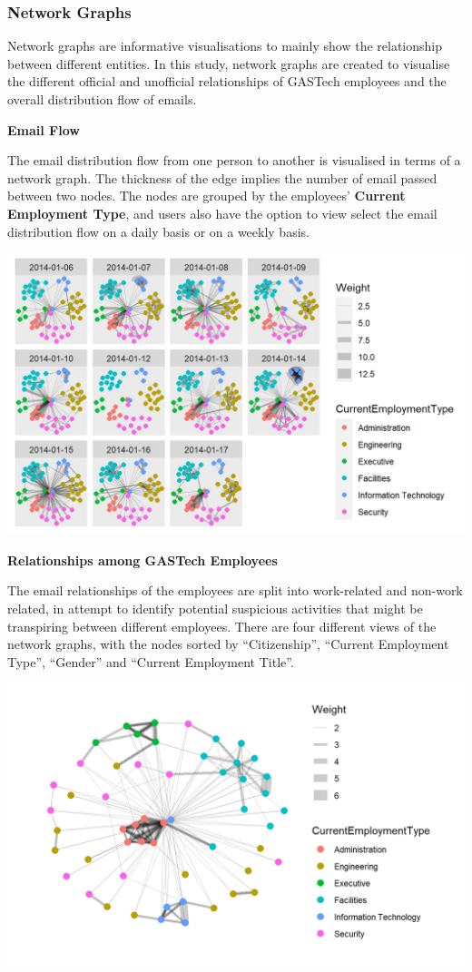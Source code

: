 \documentclass{acm_proc_article-sp}
\begin{document}
\hypertarget{network-graphs-1}{%
\subsubsection{Network Graphs}\label{network-graphs-1}}

Network graphs are informative visualisations to mainly show the
relationship between different entities. In this study, network graphs
are created to visualise the different official and unofficial
relationships of GASTech employees and the overall distribution flow of
emails.

\textbf{Email Flow}

The email distribution flow from one person to another is visualised in
terms of a network graph. The thickness of the edge implies the number
of email passed between two nodes. The nodes are grouped by the
employees' \textbf{Current Employment Type}, and users also have the
option to view select the email distribution flow on a daily basis or on
a weekly basis.

\includegraphics{img/image09.png}

\textbf{Relationships among GASTech Employees}

The email relationships of the employees are split into work-related and
non-work related, in attempt to identify potential suspicious activities
that might be transpiring between different employees. There are four
different views of the network graphs, with the nodes sorted by
``Citizenship'', ``Current Employment Type'', ``Gender'' and ``Current
Employment Title''.

\includegraphics{img/image10.png}
\end{document}
